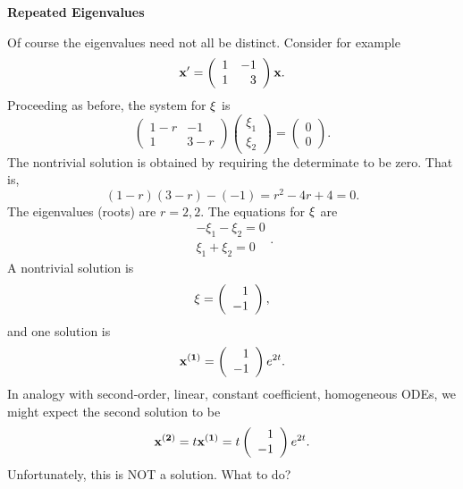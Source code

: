 \documentclass[leqno,DIV=calc,paper=a4,fontsize=11pt]{article}
\theoremstyle{definition}
\theoremstyle{plain}
\theoremstyle{remark}
\begin{document}
\vspace{.5in}
\begin{center}{\bf\sc Repeated Eigenvalues}\end{center}
Of course the eigenvalues need not all be distinct. Consider for
example
\begin{equation}
{\bf x}' = \left(\begin{array}{rr}1&-1\\1&3\end{array}\right){\bf x}.
\label{mroot}
\end{equation}
Proceeding as before, the system for ${\bf\xi}$ is
\begin{equation}
\left(
\begin{array}{cc}1-r&-1\\1&3-r\end{array}
\right)\left(\begin{array}{c}\xi_1\\ \xi_2\end{array}\right)=
\left(\begin{array}{c}0\\0\end{array}\right).
\label{xisys}
\end{equation}
The nontrivial solution is obtained by requiring the determinate to
be zero. That is,
\[
(1-r)(3-r)-(-1)= r^2-4r+4=0.
\]
The eigenvalues (roots) are $r=2,2$. The equations for ${\bf\xi}$ are
\[
\begin{array}{c}-\xi_1-\xi_2=0\\\xi_1+\xi_2=0\end{array}.
\]
A nontrivial solution is
\[
{\bf \xi} = \left(\begin{array}{r}1\\-1\end{array}\right),
\]
and one solution is
\[
{\bf x^{(1)}} = \left(\begin{array}{r}1\\-1\end{array}\right)e^{2t}.
\]
In analogy with second-order, linear, constant coefficient,
homogeneous ODEs, we might expect the second solution to be
\begin{equation}
{\bf x^{(2)}} = t{\bf x^{(1)}}
=t\left(\begin{array}{r}1\\-1\end{array}\right)e^{2t}.
\label{hope}
\end{equation}
Unfortunately, this is NOT a solution. What to do?
\end{document}

